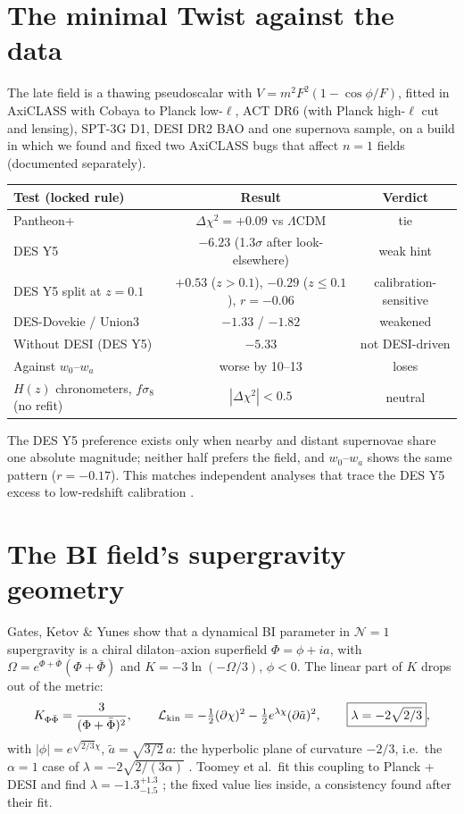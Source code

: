 \documentclass[11pt]{article}
\begin{document}
\section{The minimal Twist against the data}
The late field is a thawing pseudoscalar with $V=m^2F^2(1-\cos\phi/F)$, fitted in AxiCLASS with Cobaya to Planck
low-$\ell$, ACT DR6 (with Planck high-$\ell$ cut and lensing), SPT-3G D1, DESI DR2 BAO and one supernova sample, on a
build in which we found and fixed two AxiCLASS bugs that affect $n=1$ fields (documented separately).
\begin{center}\footnotesize
\begin{tabular}{lcc}
\toprule
Test (locked rule) & Result & Verdict \\
\midrule
Pantheon+ & $\Delta\chi^2=+0.09$ vs $\Lambda$CDM & tie \\
DES Y5 & $-6.23$ (1.3$\sigma$ after look-elsewhere) & weak hint \\
DES Y5 split at $z=0.1$ & $+0.53$ ($z>0.1$), $-0.29$ ($z\le0.1$), $r=-0.06$ & calibration-sensitive \\
DES-Dovekie / Union3 & $-1.33$ / $-1.82$ & weakened \\
Without DESI (DES Y5) & $-5.33$ & not DESI-driven \\
Against $w_0$--$w_a$ & worse by 10--13 & loses \\
$H(z)$ chronometers, $f\sigma_8$ (no refit) & $|\Delta\chi^2|<0.5$ & neutral \\
\bottomrule
\end{tabular}
\end{center}
The DES Y5 preference exists only when nearby and distant supernovae share one absolute magnitude; neither half
prefers the field, and $w_0$--$w_a$ shows the same pattern ($r=-0.17$). This matches independent analyses that trace
the DES Y5 excess to low-redshift calibration \cite{huang2025,zhang2026}.

\section{The BI field's supergravity geometry}\label{sec:geo}
Gates, Ketov \& Yunes \cite{gky2009} show that a dynamical BI parameter in $\mathcal N=1$ supergravity is a chiral
dilaton--axion superfield $\Phi=\phi+ia$, with $\Omega=e^{\Phi+\bar\Phi}(\Phi+\bar\Phi)$ and $K=-3\ln(-\Omega/3)$,
$\phi<0$. The linear part of $K$ drops out of the metric:
\begin{equation}
K_{\Phi\bar\Phi}=\frac{3}{(\Phi+\bar\Phi)^2},\qquad
\mathcal L_{\rm kin}=-\tfrac12(\partial\chi)^2-\tfrac12e^{\lambda\chi}(\partial\tilde a)^2,\qquad
\boxed{\lambda=-2\sqrt{2/3}},
\end{equation}
with $|\phi|=e^{\sqrt{2/3}\chi}$, $\tilde a=\sqrt{3/2}\,a$: the hyperbolic plane of curvature $-2/3$, i.e.\ the
$\alpha=1$ case of $\lambda=-2\sqrt{2/(3\alpha)}$ \cite{qalpha2026}. Toomey et al.\ fit this coupling to Planck + DESI
and find $\lambda=-1.3^{+1.3}_{-1.5}$ \cite{toomey2025}; the fixed value lies inside, a consistency found after their fit.
\end{document}
